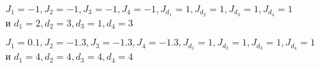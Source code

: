  \begin{figure}[h]
	\begin{minipage}{0.47\linewidth}
	\end{minipage}
	\hfill
	\begin{minipage}{0.47\linewidth}
	\end{minipage}
	\vfill
	\begin{minipage}{0.47\linewidth}
	\end{minipage}
	\caption{$J_1 = -1, J_2 = -1, J_3 = -1, J_4 = -1, J_{d_1} = 1, J_{d_2} = 1, J_{d_3} = 1, J_{d_4} = 1$ и $d_1 = 2, d_2 = 3, d_3 = 1, d_4 = 3$}
	\label{1trans}
\end{figure}

 \begin{figure}[h]
	\begin{minipage}{0.47\linewidth}
	\end{minipage}
	\hfill
	\begin{minipage}{0.47\linewidth}
	\end{minipage}
	\vfill
		\begin{minipage}{0.47\linewidth}
	\end{minipage}
	\caption{$J_1 = 0.1, J_2 = -1.3, J_3 = -1.3, J_4 = -1.3, J_{d_1} = 1, J_{d_2} = 1, J_{d_3} = 1, J_{d_4} = 1$ и $d_1 = 4, d_2 = 4, d_3 = 4, d_4 = 4$}
	\label{2trans}
\end{figure}

